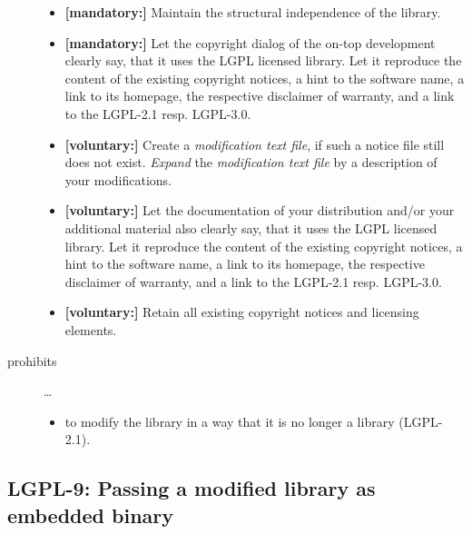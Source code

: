 \begin{description}
\begin{itemize}
  \item \textbf{[mandatory:]}  Maintain the structural independence of the
  library.
   
  \item \textbf{[mandatory:]} Let the copyright dialog of the on-top development
  clearly say, that it uses the LGPL licensed library. Let it reproduce the
  content of the existing copyright notices, a hint to the software name, a link
  to its homepage, the respective disclaimer of warranty, and a link to the
  LGPL-2.1 resp. LGPL-3.0.
     
  \item \textbf{[voluntary:]} Create a \emph{modification text file}, if such a
  notice file still does not exist. \emph{Expand} the \emph{modification text
  file} by a description of your modifications.
  
 \item \textbf{[voluntary:]} Let the documentation of your distribution and/or
  your additional material also clearly say, that it uses the LGPL licensed
  library. Let it reproduce the content of the existing copyright notices, a
  hint to the software name, a link to its homepage, the respective disclaimer
  of warranty, and a link to the LGPL-2.1 resp. LGPL-3.0.
  
  \item \textbf{[voluntary:]} Retain all existing copyright notices and
  licensing elements.
  
\end{itemize}

\item[prohibits] \ldots
\begin{itemize}
  \item to modify the library in a way that it is no longer a library
  (LGPL-2.1).
\end{itemize}

\end{description}


\subsection{LGPL-9: Passing a modified library as embedded binary}
\label{OSUC-10B-LGPL}

